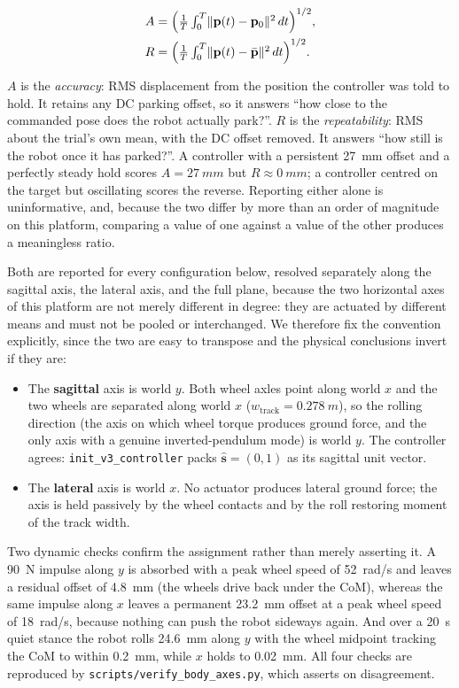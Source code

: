 \documentclass[a4paper,fleqn]{cas-dc}
\begin{document}
\begin{align}
A &= \Bigl(\tfrac{1}{T}\textstyle\int_0^T \lVert\mathbf{p}(t)-\mathbf{p}_0\rVert^2\,dt\Bigr)^{1/2},
\label{eq:accuracy}\\
R &= \Bigl(\tfrac{1}{T}\textstyle\int_0^T \lVert\mathbf{p}(t)-\bar{\mathbf{p}}\rVert^2\,dt\Bigr)^{1/2}.
\label{eq:repeatability}
\end{align}

$A$ is the \emph{accuracy}: RMS displacement from the position the controller was
told to hold. It retains any DC parking offset, so it answers ``how close to the
commanded pose does the robot actually park?''. $R$ is the \emph{repeatability}:
RMS about the trial's own mean, with the DC offset removed. It answers ``how still
is the robot once it has parked?''. A controller with a persistent \SI{27}{mm}
offset and a perfectly steady hold scores $A{=}\SI{27}{mm}$ but
$R{\approx}\SI{0}{mm}$; a controller centred on the target but oscillating scores
the reverse. Reporting either alone is uninformative, and, because the two differ
by more than an order of magnitude on this platform, comparing a value of one
against a value of the other produces a meaningless ratio.

Both are reported for every configuration below, resolved separately along the
sagittal axis, the lateral axis, and the full plane, because the two horizontal
axes of this platform are not merely different in degree: they are actuated by different means and must not be pooled or interchanged. We therefore fix the
convention explicitly, since the two are easy to transpose and the physical
conclusions invert if they are:

\begin{itemize}
\item The \textbf{sagittal} axis is world $y$. Both wheel axles point along world
$x$ and the two wheels are separated along world $x$
($w_{\text{track}}{=}\SI{0.278}{m}$), so the rolling direction (the axis on which wheel torque produces ground force, and the only axis with a genuine inverted-pendulum mode) is world $y$. The controller agrees: \verb|init_v3_controller|
packs $\hat{\mathbf{s}}=(0,1)$ as its sagittal unit vector.
\item The \textbf{lateral} axis is world $x$. No actuator produces lateral ground
force; the axis is held passively by the wheel contacts and by the roll restoring
moment of the track width.
\end{itemize}

\noindent Two dynamic checks confirm the assignment rather than merely asserting
it. A \SI{90}{N} impulse along $y$ is absorbed with a peak wheel speed of
\SI{52}{rad/s} and leaves a residual offset of \SI{4.8}{mm} (the wheels drive back under the CoM), whereas the same impulse along $x$ leaves a permanent
\SI{23.2}{mm} offset at a peak wheel speed of \SI{18}{rad/s}, because nothing can
push the robot sideways again. And over a \SI{20}{s} quiet stance the robot rolls
\SI{24.6}{mm} along $y$ with the wheel midpoint tracking the CoM to within
\SI{0.2}{mm}, while $x$ holds to \SI{0.02}{mm}. All four checks are reproduced by
\texttt{scripts/verify\_body\_axes.py}, which asserts on disagreement.
\end{document}
